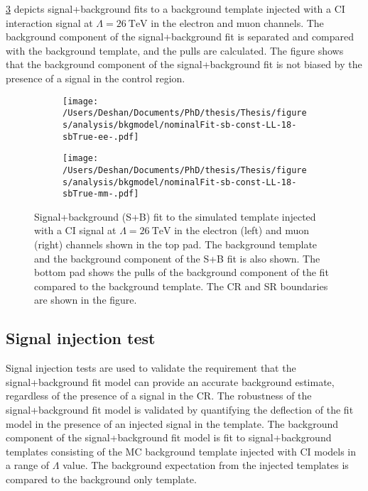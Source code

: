 \cref{fig:bkgmodel:sbfits} depicts signal+background fits to a background template injected with a CI interaction signal at $\Lambda = \SI{26}{\tera\electronvolt}$ in the electron and muon channels. The background component of the signal+background fit is separated and compared with the background template, and the pulls are calculated. The figure shows that the background component of the signal+background fit is not biased by the presence of a signal in the control region. 
\begin{figure}[h!]
    \centering
    \begin{subfigure}[b]{0.49\textwidth}
        \centering
        \texttt{[image: /Users/Deshan/Documents/PhD/thesis/Thesis/figures/analysis/bkgmodel/nominalFit-sb-const-LL-18-sbTrue-ee-.pdf]}
        \label{fig:bkgmodel:sbfits1}
    \end{subfigure}
    \begin{subfigure}[b]{0.49\textwidth}
        \centering
        \texttt{[image: /Users/Deshan/Documents/PhD/thesis/Thesis/figures/analysis/bkgmodel/nominalFit-sb-const-LL-18-sbTrue-mm-.pdf]}
        \label{fig:bkgmodel:sbfits2}
    \end{subfigure}
    \caption[Signal+Background fits to the signal+background template in the electron and muon channels]{Signal+background (S+B) fit to the simulated template injected with a CI signal at $\Lambda = \SI{26}{\tera\electronvolt}$ in the electron (left) and muon (right) channels shown in the top pad. The background template and the background component of the S+B fit is also shown. The bottom pad shows the pulls of the background component of the fit compared to the background template. The CR and SR boundaries are shown in the figure.}
    \label{fig:bkgmodel:sbfits}
\end{figure}

\subsection{Signal injection test}\label{sec:extrap:recovery}
Signal injection tests are used to validate the requirement that the signal+background fit model can provide an accurate background estimate, regardless of the presence of a signal in the CR. The robustness of the signal+background fit model is validated by quantifying the deflection of the fit model in the presence of an injected signal in the template. The background component of the signal+background fit model is fit to signal+background templates consisting of the MC background template injected with CI models in a range of $\Lambda$ value. The background expectation from the injected templates is compared to the background only template. 

